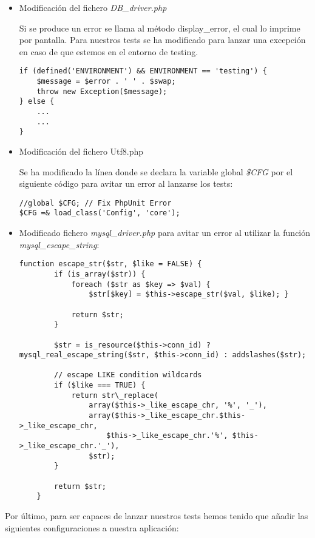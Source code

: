 \begin{itemize}

	\item Modificación del fichero \emph{DB\_driver.php}

		Si se produce un error se llama al método display\_error, el cual lo imprime por pantalla. Para nuestros tests se ha modificado para lanzar una excepción en caso de que estemos en el entorno de testing.

				\begin{lstlisting}
if (defined('ENVIRONMENT') && ENVIRONMENT == 'testing') {
	$message = $error . ' ' . $swap;
	throw new Exception($message);
} else {
	...
	...
}
				\end{lstlisting}

	\item Modificación del fichero Utf8.php

		Se ha modificado la línea donde se declara la variable global \emph{\$CFG} por el siguiente código para avitar un error al lanzarse los tests:

				\begin{lstlisting}
//global $CFG; // Fix PhpUnit Error
$CFG =& load_class('Config', 'core');
				\end{lstlisting}

	\item Modificado fichero \emph{mysql\_driver.php} para avitar un error al utilizar la función \emph{mysql\_escape\_string}:

				\begin{lstlisting}
function escape_str($str, $like = FALSE) {
		if (is_array($str)) {
			foreach ($str as $key => $val) {
				$str[$key] = $this->escape_str($val, $like); }

	   		return $str;
	   	}

	   	$str = is_resource($this->conn_id) ? mysql_real_escape_string($str, $this->conn_id) : addslashes($str);

		// escape LIKE condition wildcards
		if ($like === TRUE) {
			return str\_replace(
				array($this->_like_escape_chr, '%', '_'),
	      		array($this->_like_escape_chr.$this->_like_escape_chr,
      				$this->_like_escape_chr.'%', $this->_like_escape_chr.'_'),
	      		$str);
		}

		return $str;
	}
				\end{lstlisting}

\end{itemize}

Por último, para ser capaces de lanzar nuestros tests hemos tenido que añadir las siguientes configuraciones a nuestra aplicación:

